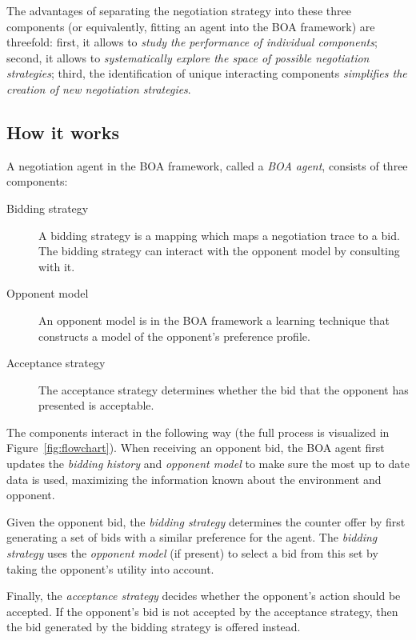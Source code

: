 \documentclass[]{article}
\begin{document}
The advantages of separating the negotiation strategy into these three components (or equivalently, fitting an agent into the BOA framework) are threefold: first, it allows to \textit{study the performance of individual components}; second, it allows to \textit{systematically explore the space of possible negotiation strategies}; third, the identification of unique interacting components \textit{simplifies the creation of new negotiation strategies}.

\subsection{How it works}
A negotiation agent in the BOA framework, called a \textit{BOA agent}, consists of three components:
\begin{description}
  \item[Bidding strategy] A bidding strategy is a mapping which maps a negotiation trace to a bid. The bidding strategy can interact with the opponent model by consulting with it.%

  \item[Opponent model] An opponent model is in the BOA framework a learning technique that constructs a model of the opponent's preference profile.%
  \item[Acceptance strategy] The acceptance strategy determines whether the bid that the opponent has presented is acceptable.
\end{description}
The components interact in the following way (the full process is visualized in Figure~\ref{fig:flowchart}). When receiving an opponent bid, the BOA agent first updates the \textit{bidding history} and \textit{opponent model} to make sure the most up to date data is used, maximizing the information known about the environment and opponent.

Given the opponent bid, the \textit{bidding strategy} determines the counter offer by first generating a set of bids with a similar preference for the agent. The \textit{bidding strategy} uses the \textit{opponent model} (if present) to select a bid from this set by taking the opponent's utility into account.

Finally, the \textit{acceptance strategy} decides whether the opponent's action should be accepted. If the opponent's bid is not accepted by the acceptance strategy, then the bid generated by the bidding strategy is offered instead.
\end{document}
